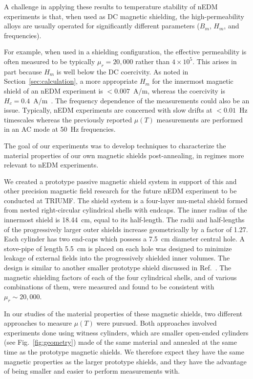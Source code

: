 \documentclass[review,number,sort&compress]{elsarticle}
\begin{document}
A challenge in applying these results to temperature stability of nEDM
experiments is that, when used as DC magnetic shielding, the
high-permeability alloys are usually operated for significantly
different parameters ($B_m$, $H_m$, and frequencies).

For example, when used in a shielding configuration, the effective
permeability is often measured to be typically $\mu_r=20,000$ rather
than $4\times 10^5$.  This arises in part because $H_m$ is well below
the DC coercivity.  As noted in Section~\ref{sec:calculation}, a more
appropriate $H_m$ for the innermost magnetic shield of an nEDM
experiment is $<0.007$~A/m, whereas the coercivity is
$H_c=0.4$~A/m~\cite{bib:kruppvdm}.  The frequency dependence of the
measurements could also be an issue.  Typically, nEDM experiments are
concerned with slow drifts at $<0.01$~Hz timescales whereas the
previously reported $\mu(T)$ measurements are performed in an AC mode
at 50~Hz frequencies.


The goal of our experiments was to develop techniques to characterize
the material properties of our own magnetic shields post-annealing, in
regimes more relevant to nEDM experiments.


We created a prototype passive magnetic shield system in support of
this and other precision magnetic field research for the future nEDM
experiment to be conducted at TRIUMF.  The shield system is a
four-layer mu-metal shield formed from nested right-circular
cylindrical shells with endcaps.  The inner radius of the innermost
shield is 18.44~cm, equal to its half-length. The radii and
half-lengths of the progressively larger outer shields increase
geometrically by a factor of 1.27.  Each cylinder has two end-caps
which possess a 7.5~cm diameter central hole.  A stove-pipe of length
5.5~cm is placed on each hole was designed to minimize leakage of
external fields into the progressively shielded inner volumes.  The
design is similar to another smaller prototype shield discussed in
Ref.~\cite{bib:nmorpaper}.  The magnetic shielding factors of each of
the four cylindrical shells, and of various combinations of them, were
measured and found to be consistent with $\mu_r\sim 20,000$.

In our studies of the material properties of these magnetic shields,
two different approaches to measure $\mu(T)$ were pursued.  Both
approaches involved experiments done using witness cylinders, which
are smaller open-ended cylinders (see Fig.~\ref{fig:geometry}) made of
the same material and annealed at the same time as the prototype
magnetic shields.  We therefore expect they have the same magnetic
properties as the larger prototype shields, and they have the
advantage of being smaller and easier to perform measurements with.
\end{document}
